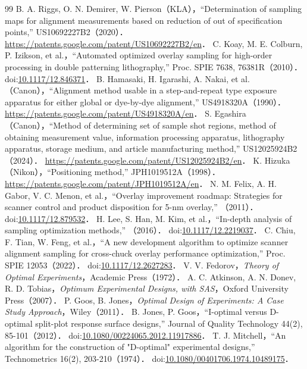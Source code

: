 \documentclass[10.5pt,a4paper]{ltjsarticle}
\begin{document}
\begin{thebibliography}{99}
 B. A. Riggs, O. N. Demirer, W. Pierson（KLA），``Determination of sampling maps for alignment measurements based on reduction of out of specification points,'' US10692227B2（2020）． \url{https://patents.google.com/patent/US10692227B2/en}．
 C. Koay, M. E. Colburn, P. Izikson, et al.，``Automated optimized overlay sampling for high-order processing in double patterning lithography,'' Proc. SPIE 7638, 76381R（2010）． doi:\href{https://doi.org/10.1117/12.846371}{10.1117/12.846371}．
 B. Hamasaki, H. Igarashi, A. Nakai, et al.（Canon），``Alignment method usable in a step-and-repeat type exposure apparatus for either global or dye-by-dye alignment,'' US4918320A（1990）． \url{https://patents.google.com/patent/US4918320A/en}．
 S. Egashira（Canon），``Method of determining set of sample shot regions, method of obtaining measurement value, information processing apparatus, lithography apparatus, storage medium, and article manufacturing method,'' US12025924B2（2024）． \url{https://patents.google.com/patent/US12025924B2/en}．
 K. Hizuka（Nikon），``Positioning method,'' JPH1019512A（1998）． \url{https://patents.google.com/patent/JPH1019512A/en}．
 N. M. Felix, A. H. Gabor, V. C. Menon, et al.，``Overlay improvement roadmap: Strategies for scanner control and product disposition for 5-nm overlay,'' （2011）． doi:\href{https://doi.org/10.1117/12.879532}{10.1117/12.879532}．
 H. Lee, S. Han, M. Kim, et al.，``In-depth analysis of sampling optimization methods,'' （2016）． doi:\href{https://doi.org/10.1117/12.2219037}{10.1117/12.2219037}．
 C. Chiu, F. Tian, W. Feng, et al.，``A new development algorithm to optimize scanner alignment sampling for cross-chuck overlay performance optimization,'' Proc. SPIE 12053（2022）． doi:\href{https://doi.org/10.1117/12.2627283}{10.1117/12.2627283}．
 V. V. Fedorov，\textit{Theory of Optimal Experiments}，Academic Press（1972）．
 A. C. Atkinson, A. N. Donev, R. D. Tobias，\textit{Optimum Experimental Designs, with SAS}，Oxford University Press（2007）．
 P. Goos, B. Jones，\textit{Optimal Design of Experiments: A Case Study Approach}，Wiley（2011）．
 B. Jones, P. Goos，``I-optimal versus D-optimal split-plot response surface designs,'' Journal of Quality Technology 44(2), 85-101（2012）． doi:\href{https://doi.org/10.1080/00224065.2012.11917886}{10.1080/00224065.2012.11917886}．
 T. J. Mitchell，``An algorithm for the construction of "D-optimal" experimental designs,'' Technometrics 16(2), 203-210（1974）． doi:\href{https://doi.org/10.1080/00401706.1974.10489175}{10.1080/00401706.1974.10489175}．

\end{thebibliography}
\end{document}
